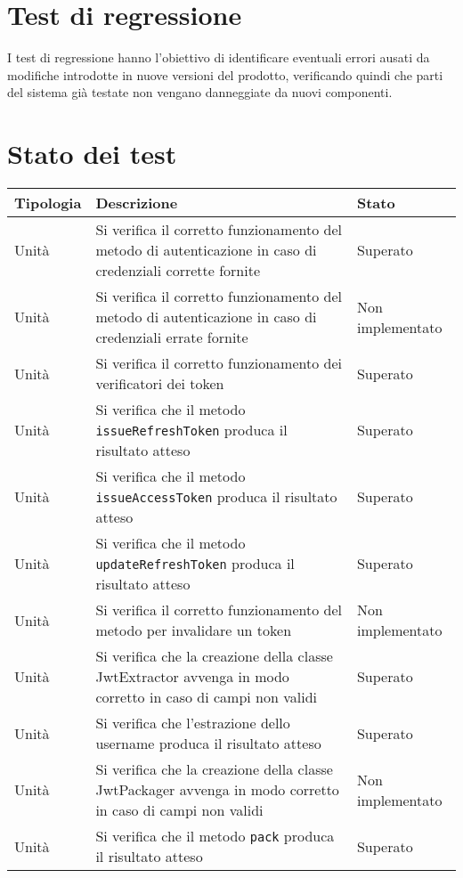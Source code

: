 \section{Test di regressione}
I test di regressione hanno l'obiettivo di identificare eventuali errori ausati da modifiche introdotte in nuove versioni del prodotto, verificando quindi che parti del sistema già testate non vengano danneggiate da nuovi componenti.

\section{Stato dei test}

\begin{center}
    \begin{xltabular}{\linewidth}{|l|X|l|}
        \hline
        \textbf{Tipologia} & \textbf{Descrizione} & \textbf{Stato}\\
        \hline
        Unità & Si verifica il corretto funzionamento del metodo di autenticazione in caso di credenziali corrette fornite & Superato\\
        Unità & Si verifica il corretto funzionamento del metodo di autenticazione in caso di credenziali errate fornite & Non implementato\\
        Unità & Si verifica il corretto funzionamento dei verificatori dei token & Superato\\
        Unità & Si verifica che il metodo \texttt{issueRefreshToken} produca il risultato atteso & Superato\\
        Unità & Si verifica che il metodo \texttt{issueAccessToken} produca il risultato atteso & Superato\\
        Unità & Si verifica che il metodo \texttt{updateRefreshToken} produca il risultato atteso & Superato\\
        Unità & Si verifica il corretto funzionamento del metodo per invalidare un token & Non implementato\\
        Unità & Si verifica che la creazione della classe JwtExtractor avvenga in modo corretto in caso di campi non validi & Superato\\
        Unità & Si verifica che l'estrazione dello username produca il risultato atteso & Superato\\
        Unità & Si verifica che la creazione della classe JwtPackager avvenga in modo corretto in caso di campi non validi & Non implementato\\
        Unità & Si verifica che il metodo \texttt{pack} produca il risultato atteso & Superato\\

\end{xltabular}
\end{center}
